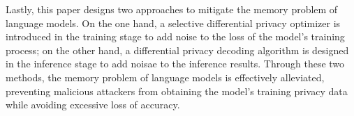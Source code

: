 \begin{abstract*}
  Lastly, this paper designs two approaches to mitigate the memory problem of language models. On the one hand, a selective differential privacy optimizer is introduced in the training stage to add noise to the loss of the model's training process; on the other hand, a differential privacy decoding algorithm is designed in the inference stage to add noisae to the inference results. Through these two methods, the memory problem of language models is effectively alleviated, preventing malicious attackers from obtaining the model's training privacy data while avoiding excessive loss of accuracy.
  
\end{abstract*}
